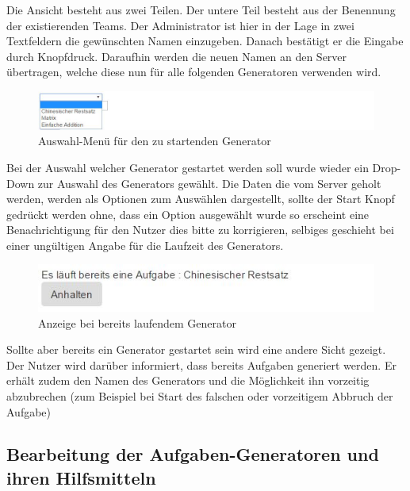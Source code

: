 \begin{enumerate}
Die Ansicht besteht aus zwei Teilen. Der untere Teil besteht aus der Benennung der existierenden Teams. Der Administrator ist hier in der Lage in zwei Textfeldern die gewünschten Namen einzugeben. Danach bestätigt er die Eingabe durch Knopfdruck. Daraufhin werden die neuen Namen an den Server übertragen, welche diese nun für alle folgenden Generatoren verwenden wird. \\

\begin{figure}[htp]     %
\centering
\includegraphics[width=1\textwidth]{bilder/StartDropDown} 
\caption[Auswahl-Menü für den zu startenden Generator]{Auswahl-Menü für den zu startenden Generator}
\end{figure} 

Bei der Auswahl welcher Generator gestartet werden soll wurde wieder ein Drop-Down zur Auswahl des Generators gewählt. Die Daten die vom Server geholt werden, werden als Optionen zum Auswählen dargestellt, sollte der Start Knopf gedrückt werden ohne, dass ein Option ausgewählt wurde so erscheint eine Benachrichtigung für den Nutzer dies bitte zu korrigieren, selbiges geschieht bei einer ungültigen Angabe für die Laufzeit des Generators. \\

\begin{figure}[htp]     %
\centering
\includegraphics[width=1\textwidth]{bilder/TaskRunning} 
\caption[Anzeige bei bereits laufendem Generator]{Anzeige bei bereits laufendem Generator}
\end{figure} 

Sollte aber bereits ein Generator gestartet sein wird eine andere Sicht gezeigt. Der Nutzer wird darüber informiert, dass bereits Aufgaben generiert werden. Er erhält zudem den Namen des Generators und die Möglichkeit ihn vorzeitig abzubrechen (zum Beispiel bei Start des falschen oder vorzeitigem Abbruch der Aufgabe)


\subsection{Bearbeitung der Aufgaben-Generatoren und ihren Hilfsmitteln} \label{EditGenerator}

\end{enumerate}
